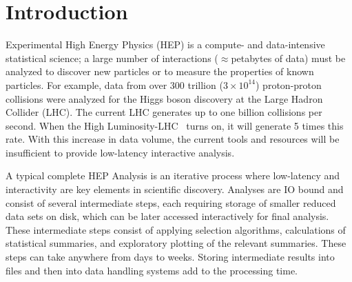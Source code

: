 \section{Introduction}
\label{sec:intro}
\squeezeup

 
Experimental High Energy Physics (HEP) is a compute- and data-intensive statistical science; 
a large number of interactions ($\approx$petabytes of data)
must be analyzed to discover new particles or to measure the properties of known particles. 
For example, data from over $300$ trillion ($3\times10^{14}$) proton-proton collisions were analyzed for the Higgs boson discovery at the 
Large Hadron Collider (LHC). 
The current LHC generates up to one billion collisions per second. When the High Luminosity-LHC~\cite{hllhc} turns on, it will generate 5 times this rate.
With this increase in data volume, the current tools and resources will be insufficient to 
provide low-latency interactive analysis. 

A typical complete HEP Analysis is an iterative process where low-latency and interactivity are key elements in scientific discovery. 
Analyses are IO bound and consist of several intermediate steps, each requiring storage of 
smaller reduced data sets on disk, which can be later accessed interactively for final analysis. 
These intermediate steps consist of applying selection algorithms, calculations of statistical summaries, 
and exploratory plotting of the relevant summaries. 
These steps can take anywhere from days to weeks. 
Storing intermediate results into files and then into data handling systems 
add to the processing time. 

